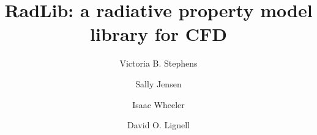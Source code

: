 \documentclass[preprint,12pt]{elsarticle}
\begin{document}
    \begin{frontmatter}



        \title{RadLib: a radiative property model library for CFD}




        \author{Victoria B. Stephens}
        \author{Sally Jensen}
        \author{Isaac Wheeler}
        \author{David O. Lignell}


        \address{Department of Chemical Engineering, Brigham Young University, Provo, UT 84602, United States}



\end{frontmatter}
\end{document}
